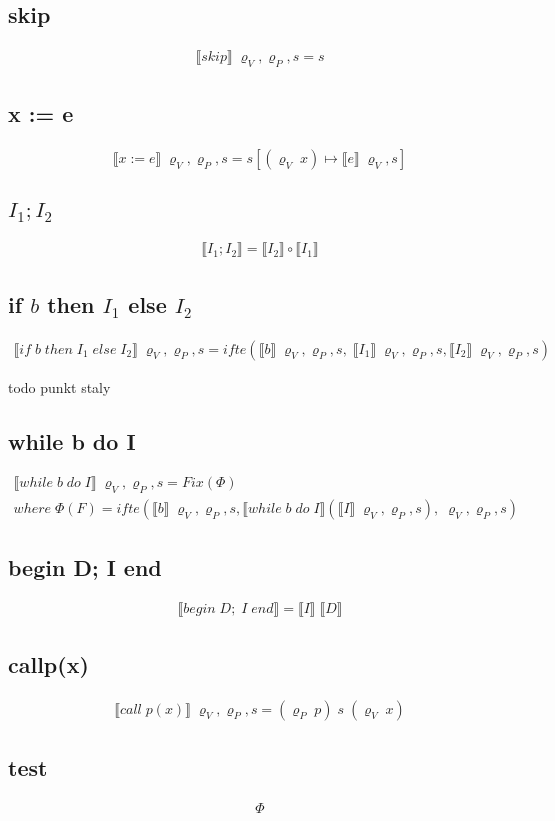 \documentclass[12pt]{article}
\newcommand{\sem}[1]{\llbracket #1 \rrbracket}
\newcommand{\srod}{\;\varrho_{V}, s}
\newcommand{\srodP}{\;\varrho_{V}, \varrho_{P}, s}
\newcommand{\eq}[2]{\subsection*{#1} \begin{gather*} #2 \end{gather*}}
\begin{document}
\eq {skip} {
	\sem{skip} \srodP = s
}

\eq {x := e} {
	\sem{x := e} \srodP = s[(\varrho_V \; x) \mapsto \sem{e} \srod]
}

\eq {$I_1;I_2$} {
	\sem{I_1;I_2} = \sem{I_2} \circ \sem{I_1}
}

\eq {if $b$ then $I_1$ else $I_2$} {
	\sem{if\;b\;then\;I_1\;else\;I_2} \srodP = ifte(\sem{b}\srodP,\;\sem{I_1}\srodP, \sem{I_2}\srodP )
}


todo punkt staly
\eq {while b do I} {
	\sem{while\;b\;do\;I} \srodP = Fix(\Phi) \\ 
	where \; \Phi(F) = ifte(\sem{b}\srodP, \sem{while\;b\;do\;I} (\sem{I} \srodP),\srodP)
}

\eq {begin D; I end} {
	\sem{begin\;D;\;I\;end} = \sem{I} \; \sem{D}
}

\eq {call\;p(x)} {
	\sem{call\;p(x)} \srodP = (\varrho_P \; p) \; s \; (\varrho_V \; x)
}

\eq {test} {
	\Phi
}
\end{document}
